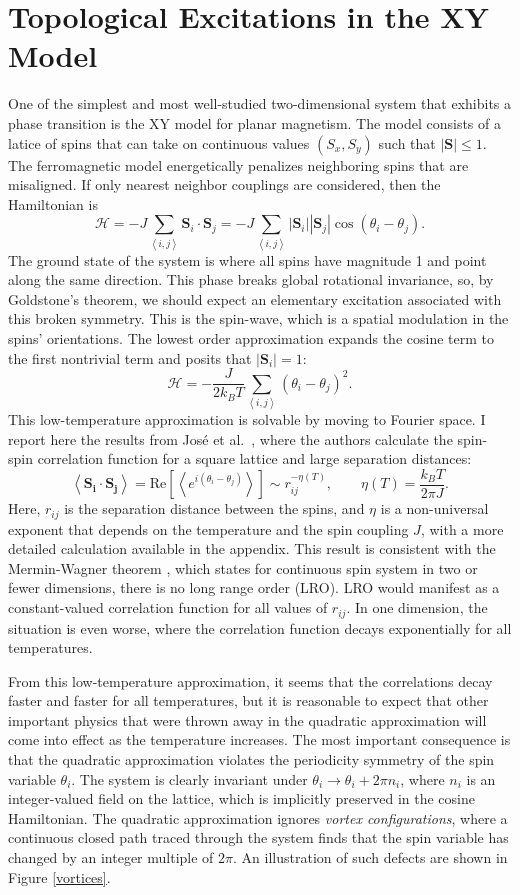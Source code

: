 \documentclass[a4paper,10pt]{article}
\newcommand{\beq}{\begin{equation}}
\newcommand{\eeq}{\end{equation}}
\renewcommand{\th}{\theta}
\newcommand{\avg}[1]{\left \langle #1 \right \rangle}
\newcommand{\abs}[1]{\ensuremath{\left | #1 \right |}}
\newcommand{\paren}[1]{\left(#1\right)}
\newcommand{\goto}{\rightarrow}
\newcommand{\bv}[1]{\mathbf{#1}}
\renewcommand{\Dot}[2]{\ensuremath{\bv{#1}\cdot\bv{#2}}}
\begin{document}
\section{Topological Excitations in the XY Model}
One of the simplest and most well-studied two-dimensional system that exhibits 
a phase transition is the XY model for planar magnetism. The model consists of 
a latice of spins that can take on continuous values $(S_x,S_y)$ such that 
$\abs{\bv{S}} \leq 1$. The ferromagnetic model energetically penalizes 
neighboring spins that are misaligned. If only nearest neighbor couplings are 
considered, then the Hamiltonian is
\beq \mathcal{H} = -J \sum_{\left \langle i,j \right \rangle} \bv S_i \cdot 
\bv S_j = -J \sum_{\left \langle i,j \right \rangle} \abs{\bv S_i}\abs{\bv 
S_j}\cos\paren{\th_i - \th_j}.\eeq
The ground state of the system is where all spins have magnitude 1 and point 
along the same direction. This phase breaks global rotational invariance, so, 
by Goldstone's theorem, we should expect an elementary excitation 
associated with this broken symmetry. This is the spin-wave, which is a spatial 
modulation in the spins' orientations. The lowest order approximation expands 
the cosine term to the first nontrivial term and posits that $\abs{\bv S_i} 
= 1$:
\beq \mathcal{H} = -\frac{J}{2k_BT}\sum_{\left \langle i,j \right \rangle} 
\paren{\th_i-\th_j}^2. \eeq
This low-temperature approximation is solvable by moving to Fourier 
space. I report here the results 
from Jos\'e et al.~\cite{Jose}, where the authors calculate the spin-spin 
correlation function for a square lattice and large separation distances:
\beq \avg{\Dot{S_i}{S_j}} = \mathrm{Re}\left[\avg{e^{i(\th_i-\th_j)}}\right ] 
\sim r_{ij}^{-\eta(T)}, \qquad \eta(T) = \frac{k_BT}{2\pi J}. \eeq
Here, $r_{ij}$ is the separation distance between the spins, and $\eta$ is a 
non-universal exponent that depends on the temperature and the spin coupling 
$J$, with a more detailed calculation available in the appendix. This result is 
consistent with the Mermin-Wagner theorem \cite{MerminWagner}, which states for 
continuous spin system in two or fewer dimensions, there is no long range order 
(LRO). LRO would manifest as a constant-valued correlation function for all 
values of $r_{ij}$. In one dimension, the situation is even worse, where the 
correlation function decays exponentially for all temperatures.

From this low-temperature approximation, it seems that the correlations decay 
faster and faster for all temperatures, but it is reasonable to expect that 
other important physics that were thrown away in the quadratic approximation 
will come into effect as the temperature increases. The most important 
consequence is that the quadratic approximation violates the periodicity 
symmetry of the spin variable $\th_i$. The system is clearly invariant under 
$\th_i \goto \th_i + 2\pi n_i$, where $n_i$ is an integer-valued field on the 
lattice, which is implicitly preserved in the cosine Hamiltonian. The quadratic 
approximation ignores \emph{vortex configurations}, where a continuous closed 
path traced through the system finds that the spin variable has changed by an 
integer multiple of $2\pi$. An illustration of such defects are shown in Figure 
\ref{vortices}.
\end{document}

